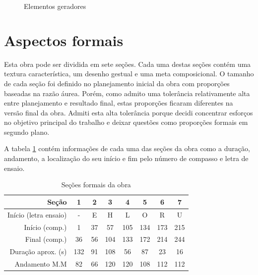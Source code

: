 \begin{figure}
  \centering

  \caption{Elementos geradores}
  \label{fig:elementos-geradores}
\end{figure}

\section{Aspectos formais}
\label{sec:aspectos-formais}

Esta obra pode ser dividida em sete seções. Cada uma destas seções
contém uma textura característica, um desenho gestual e uma meta
composicional.
O tamanho de cada seção foi definido no planejamento inicial da obra
com proporções baseadas na razão áurea.
Porém, como admito uma tolerância relativamente alta entre
planejamento e resultado final, estas proporções ficaram diferentes na
versão final da obra.
Admiti esta alta tolerância porque decidi concentrar esforços no
objetivo principal do trabalho e deixar questões como proporções
formais em segundo plano.

A tabela \ref{tab:secoes-obra} contém informações de cada uma das
seções da obra como a duração, andamento, a localização do seu início
e fim pelo número de compasso e letra de ensaio.

\begin{table}[!h]
  \centering
  \begin{tabular}{r|ccccccc}
    Seção & 1 & 2 & 3 & 4 & 5 & 6 & 7 \\
    \hline
    Início (letra ensaio) & - & E & H & L & O & R & U \\
    Início (comp.) & 1 & 37 & 57 & 105 & 134 & 173 & 215 \\
    Final (comp.) & 36 & 56 & 104 & 133 & 172 & 214 & 244 \\
    Duração aprox. (s) & 132 & 91 & 108 & 56 & 87 & 23 & 16\\
    Andamento M.M & 82 & 66 & 120 & 120 & 108 & 112 & 112 \\
  \end{tabular}
  \caption{Seções formais da obra}
  \label{tab:secoes-obra}
\end{table}

